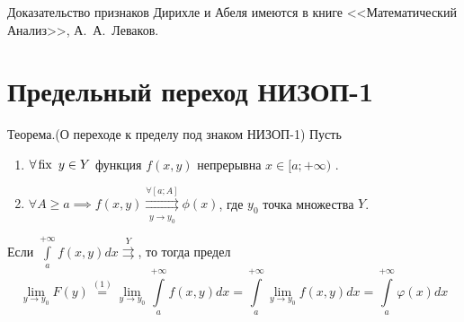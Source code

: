 \documentclass[../../main.tex]{subfiles}
\begin{document}
Доказательство признаков Дирихле и Абеля имеются в книге <<Математический 
Анализ>>, А.~А.~Леваков.


\section{ Предельный переход НИЗОП-1}
\begin{thm}Теорема.(О переходе к пределу под знаком НИЗОП-1)
Пусть

\begin{enumerate}
\item $\forall \operatorname{fix} \ y \in Y$ функция $f(x,y)$ непрерывна $x \in [a;+\infty)$ 
.
\item $\forall A \ge a \implies f(x,y) \overset{\forall [a;A]}{\underset{y \to 
y_0}{\rightrightarrows}} \phi(x) $, где $y_0$ точка множества $Y$.
\end{enumerate}

Если $\int\limits_a^{+\infty}f(x,y)dx \overset{Y}\rightrightarrows $, то тогда 
предел \begin{equation}\label{lec10:12}
\underset{y \to y_0}\lim F(y) \overset{(1)}= \underset{y \to 
y_0}\lim\int\limits_a^{+\infty}f(x,y)dx =\int\limits_a^{+\infty} \underset{y 
\to y_0}\lim f(x,y)dx = \int\limits_a^{+\infty}\varphi(x)dx \end{equation}
\end{thm}
\end{document}
